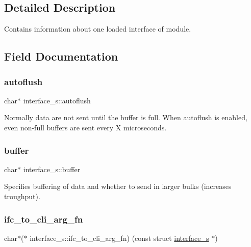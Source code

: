 \subsection{Detailed Description}
Contains information about one loaded interface of module. 

\subsection{Field Documentation}
\mbox{\label{structinterface__s_a376ab6a176e70c12a7f4ccc5a6b22f01}} 
\subsubsection{\texorpdfstring{autoflush}{autoflush}}
{\footnotesize\ttfamily char$\ast$ interface\+\_\+s\+::autoflush}

Normally data are not sent until the buffer is full. When autoflush is enabled, even non-\/full buffers are sent every X microseconds. \mbox{\label{structinterface__s_aac385a8eeeaf8566d36048a5a3fb6744}} 
\subsubsection{\texorpdfstring{buffer}{buffer}}
{\footnotesize\ttfamily char$\ast$ interface\+\_\+s\+::buffer}

Specifies buffering of data and whether to send in larger bulks (increases troughput). \mbox{\label{structinterface__s_a4f24efb8acb3f606561010905907f810}} 
\subsubsection{\texorpdfstring{ifc\+\_\+to\+\_\+cli\+\_\+arg\+\_\+fn}{ifc\_to\_cli\_arg\_fn}}
{\footnotesize\ttfamily char$\ast$($\ast$ interface\+\_\+s\+::ifc\+\_\+to\+\_\+cli\+\_\+arg\+\_\+fn) (const struct \hyperlink{structinterface__s}{interface\+\_\+s} $\ast$)}

